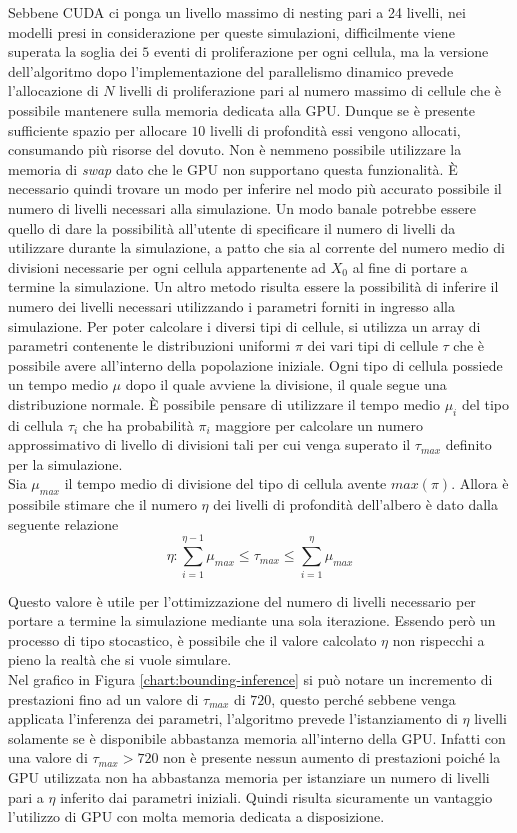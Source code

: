 Sebbene CUDA ci ponga un livello massimo di nesting pari a 24 livelli,
nei modelli presi in considerazione per queste simulazioni, difficilmente
viene superata la soglia dei $5$ eventi di proliferazione per ogni cellula,
ma la versione dell'algoritmo dopo l'implementazione del parallelismo dinamico
prevede l'allocazione di $N$ livelli di proliferazione pari al numero massimo
di cellule che è possibile mantenere sulla memoria dedicata alla GPU.
Dunque se è presente sufficiente
spazio per allocare $10$ livelli di profondità essi vengono allocati,
consumando più risorse del dovuto. Non è nemmeno possibile utilizzare
la memoria di \textit{swap} dato che le GPU non supportano questa
funzionalità.
È necessario quindi trovare un modo per inferire nel modo più accurato
possibile il numero di livelli necessari alla simulazione.
Un modo banale potrebbe essere quello di dare la possibilità all'utente di
specificare il numero di livelli da utilizzare durante la simulazione,
a patto che sia al corrente del numero medio di divisioni necessarie per ogni cellula
appartenente ad $X_{0}$ al fine di portare a termine la simulazione.
Un altro metodo risulta essere la possibilità di inferire il numero dei livelli
necessari utilizzando i parametri forniti in ingresso alla simulazione.
Per poter calcolare i diversi tipi di cellule, si utilizza un array di
parametri contenente le distribuzioni uniformi $\pi$ dei vari tipi di cellule
$\tau$ che è possibile avere all'interno della popolazione iniziale.
Ogni tipo di cellula possiede un tempo medio $\mu$ dopo il quale avviene
la divisione, il quale segue una distribuzione normale.
È possibile pensare di utilizzare il tempo medio $\mu_{i}$ del tipo di cellula
$\tau_{i}$ che ha probabilità $\pi_{i}$ maggiore per calcolare un numero
approssimativo di livello di divisioni tali per cui venga superato il
$\tau_{max}$ definito per la simulazione.
\\
Sia $\mu_{max}$ il tempo medio di divisione
del tipo di cellula avente $max(\pi)$.
Allora è possibile stimare che il numero $\eta$ dei livelli di profondità
dell'albero è dato dalla seguente relazione
$$\eta : \sum\limits_{i=1}^{\eta - 1}
\mu_{max} \leqslant \tau_{max} \leqslant \sum\limits_{i=1}^{\eta} \mu_{max}$$

Questo valore è utile per l'ottimizzazione del numero di livelli necessario
per portare a termine la simulazione mediante una sola iterazione.
Essendo però un processo di tipo stocastico, è possibile che il valore calcolato
$\eta$ non rispecchi a pieno la realtà che si vuole simulare.
\\
Nel grafico in Figura \ref{chart:bounding-inference} si può notare un
incremento di prestazioni fino
ad un valore di $\tau_{max}$ di $720$, questo perché sebbene venga applicata
l'inferenza dei parametri, l'algoritmo prevede l'istanziamento di $\eta$
livelli solamente se è disponibile abbastanza memoria all'interno della GPU.
Infatti con una valore di $\tau_{max} > 720$ non è presente nessun aumento
di prestazioni poiché la GPU utilizzata non ha abbastanza memoria per istanziare
un numero di livelli pari a $\eta$ inferito dai parametri iniziali.
Quindi risulta sicuramente un vantaggio l'utilizzo di GPU con molta memoria
dedicata a disposizione.

